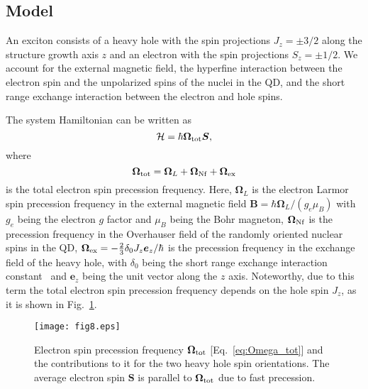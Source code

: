 \documentclass[twocolumn,showpacs,preprintnumbers,amsmath,amssymb,aps]{revtex4-1}
\begin{document}
\subsection{Model}
\label{sec:model}

An exciton consists of a heavy hole with the spin projections
$J_z=\pm3/2$ along the structure growth axis $z$ and an electron
with the spin projections $S_z=\pm1/2$. We account for the external
magnetic field, the hyperfine interaction between the electron spin
and the unpolarized spins of the nuclei in the QD, and the short
range exchange interaction between the electron and hole spins.

The system Hamiltonian can be written as
\begin{equation}
  \mathcal H=\hbar\bm\Omega_{\rm tot}\bm S,
\end{equation}
where
\begin{equation}
  \label{eq:Omega_tot}
  \bm\Omega_{\rm tot}=\bm\Omega_L+\bm\Omega_{\rm Nf} +  \bm\Omega_{\rm ex}
\end{equation}
is the total electron spin precession frequency. Here, $\bm
\Omega_L$ is the electron Larmor spin precession frequency in the
external magnetic field $\bm B=\hbar\bm\Omega_L/(g_e\mu_B)$ with
$g_e$ being the electron $g$ factor and $\mu_B$ being the Bohr
magneton, $\bm\Omega_{\rm Nf}$ is the precession frequency in the
Overhauser field of the randomly oriented nuclear spins in the QD,
$\bm\Omega_{\rm ex} = -\frac{2}{3}\delta_0J_z \bm{e}_z/\hbar$ is the
precession frequency in the exchange field of the heavy hole, with
$\delta_0$ being the short range exchange interaction
constant~\cite{Ivch_book,Astakhov} and $\bm{e}_z$ being the unit
vector along the $z$ axis. Noteworthy, due to this term the total
electron spin precession frequency depends on the hole spin $J_z$,
as it is shown in Fig.~\ref{fig8}.


\begin{figure}[t]
\centering
\texttt{[image: fig8.eps]}
\caption{Electron spin precession frequency $\bm\Omega_{\rm tot}$
[Eq.~\eqref{eq:Omega_tot}] and the contributions to it for the two
heavy hole spin orientations. The average electron spin $\bm S$ is
parallel to $\bm\Omega_{\rm tot}$ due to fast precession.}
\label{fig8}
\end{figure}
\end{document}
